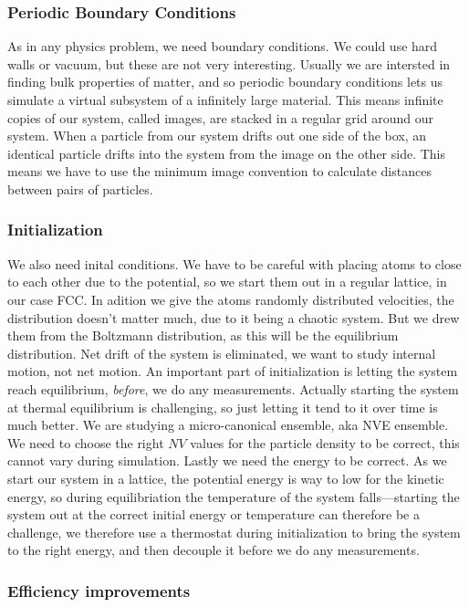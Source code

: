 \documentclass[a4paper, 11pt, notitlepage, english]{article}
\begin{document}
\subsubsection*{Periodic Boundary Conditions}

As in any physics problem, we need boundary conditions. We could use hard walls or vacuum, but these are not very interesting. Usually we are intersted in finding bulk properties of matter, and so periodic boundary conditions lets us simulate a virtual subsystem of a infinitely large material. This means infinite copies of our system, called images, are stacked in a regular grid around our system. When a particle from our system drifts out one side of the box, an identical particle drifts into the system from the image on the other side. This means we have to use the minimum image convention to calculate distances between pairs of particles.

\subsubsection*{Initialization}

We also need inital conditions. We have to be careful with placing atoms to close to each other due to the potential, so we start them out in a regular lattice, in our case FCC. In adition we give the atoms randomly distributed velocities, the distribution doesn't matter much, due to it being a chaotic system. But we drew them from the Boltzmann distribution, as this will be the equilibrium distribution. Net drift of the system is eliminated, we want to study internal motion, not net motion. An important part of initialization is letting the system reach equilibrium, \emph{before}, we do any measurements. Actually starting the system at thermal equilibrium is challenging, so just letting it tend to it over time is much better. We are studying a micro-canonical ensemble, aka NVE ensemble. We need to choose the right $NV$ values for the particle density to be correct, this cannot vary during simulation. Lastly we need the energy to be correct. As we start our system in a lattice, the potential energy is way to low for the kinetic energy, so during equilibriation the temperature of the system falls---starting the system out at the correct initial energy or temperature can therefore be a challenge, we therefore use a thermostat during initialization to bring the system to the right energy, and then decouple it before we do any measurements.

\subsubsection*{Efficiency improvements}
\end{document}

